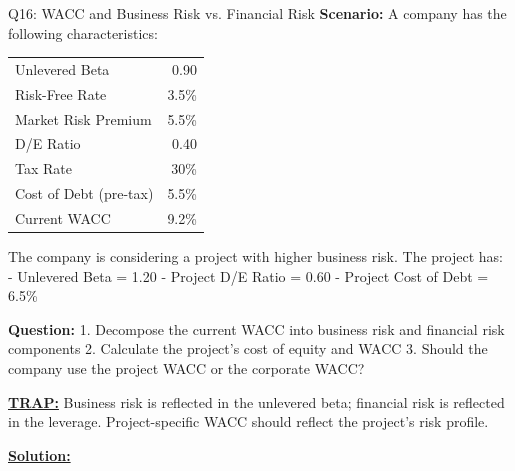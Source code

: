 \documentclass{beamer}
\renewcommand{\scriptsize}{\fontsize{6pt}{7pt}\selectfont}
\begin{document}
	\begin{frame}{Q16: WACC and Business Risk vs. Financial Risk}
		\scriptsize
		\textbf{Scenario:} A company has the following characteristics:
		
		\begin{tabular}{lr}
			Unlevered Beta & 0.90 \\
			Risk-Free Rate & 3.5\% \\
			Market Risk Premium & 5.5\% \\
			D/E Ratio & 0.40 \\
			Tax Rate & 30\% \\
			Cost of Debt (pre-tax) & 5.5\% \\
			Current WACC & 9.2\% \\
		\end{tabular}
		
		The company is considering a project with higher business risk. The project has:
		- Unlevered Beta = 1.20
		- Project D/E Ratio = 0.60
		- Project Cost of Debt = 6.5\%
		
		\textbf{Question:}
		1. Decompose the current WACC into business risk and financial risk components
		2. Calculate the project's cost of equity and WACC
		3. Should the company use the project WACC or the corporate WACC?
		
		\vspace{2pt}
		\underline{\textbf{TRAP:}} Business risk is reflected in the unlevered beta; financial risk is reflected in the leverage. Project-specific WACC should reflect the project's risk profile.
		
		\vspace{4pt}
		\underline{\textbf{Solution:}}
	\end{frame}
	
\end{document}

